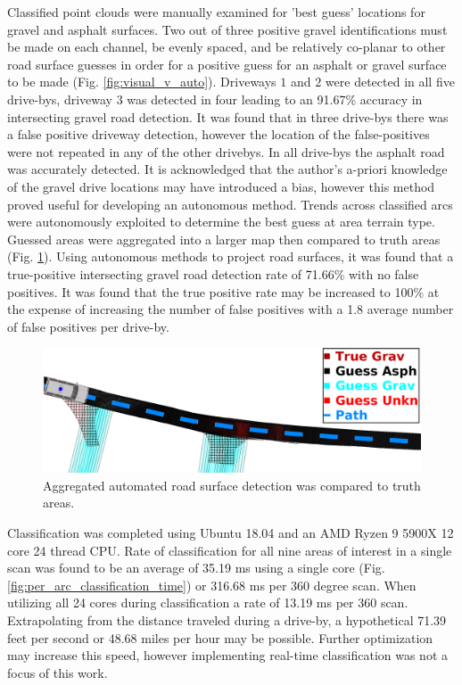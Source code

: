 \documentclass[journal,onecolumn]{IEEEtran}
\begin{document}
		{Classified point clouds were manually examined for 'best guess' locations for gravel and asphalt surfaces. Two out of three positive gravel identifications must be made on each channel, be evenly spaced, and be relatively co-planar to other road surface guesses in order for a positive guess for an asphalt or gravel surface to be made (Fig. \ref{fig:visual_v_auto}). Driveways $1$ and $2$ were detected in all five drive-bys, driveway $3$ was detected in four leading to an 91.67\% accuracy in intersecting gravel road detection. It was found that in three drive-bys there was a false positive driveway detection, however the location of the false-positives were not repeated in any of the other drivebys. In all drive-bys the asphalt road was accurately detected. It is acknowledged that the author's a-priori knowledge of the gravel drive locations may have introduced a bias, however this method proved useful for developing an autonomous method. Trends across classified arcs were autonomously exploited to determine the best guess at area terrain type. Guessed areas were aggregated into a larger map then compared to truth areas (Fig. \ref{fig:guess_grav_intersect}). Using autonomous methods to project road surfaces, it was found that a true-positive intersecting gravel road detection rate of 71.66\% with no false positives. It was found that the true positive rate may be increased to 100\% at the expense of increasing the number of false positives with a 1.8 average number of false positives per drive-by.}
		
		\begin{figure}[H]
			\centering
			\includegraphics[width=0.95\linewidth]{figures/db1_conf_elim_auto_guess_mca}
			\caption[Aggregated Automated Road Surface Detection]{Aggregated automated road surface detection was compared to truth areas. }
			\label{fig:guess_grav_intersect}
		\end{figure}
	
		{Classification was completed using Ubuntu 18.04 and an AMD Ryzen 9 5900X 12 core 24 thread CPU. Rate of classification for all nine areas of interest in a single scan was found to be an average of 35.19 ms using a single core (Fig. \ref{fig:per_arc_classification_time}) or 316.68 ms per 360 degree scan. When utilizing all 24 cores during classification a rate of 13.19 ms per 360 scan. Extrapolating from the distance traveled during a drive-by, a hypothetical 71.39 feet per second or 48.68 miles per hour may be possible. Further optimization may increase this speed, however implementing real-time classification was not a focus of this work.}
		
\end{document}
